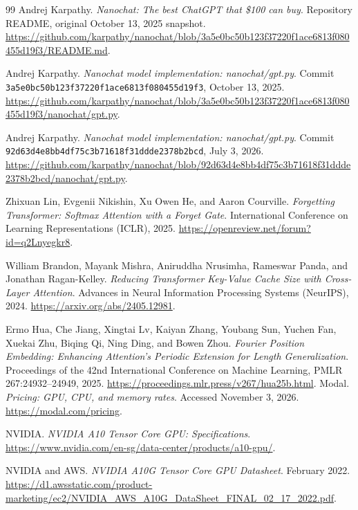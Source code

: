 \documentclass[11pt]{article}
\begin{document}
\clearpage
\begin{thebibliography}{99}
Andrej Karpathy. \emph{Nanochat: The best ChatGPT that \$100 can buy}.
Repository README, original October 13, 2025 snapshot.
\url{https://github.com/karpathy/nanochat/blob/3a5e0bc50b123f37220f1ace6813f080455d19f3/README.md}.

Andrej Karpathy. \emph{Nanochat model implementation: nanochat/gpt.py}.
Commit \texttt{3a5e0bc50b123f37220f1ace6813f080455d19f3}, October 13, 2025.
\url{https://github.com/karpathy/nanochat/blob/3a5e0bc50b123f37220f1ace6813f080455d19f3/nanochat/gpt.py}.

Andrej Karpathy. \emph{Nanochat model implementation: nanochat/gpt.py}.
Commit \texttt{92d63d4e8bb4df75c3b71618f31ddde2378b2bcd}, July 3, 2026.
\url{https://github.com/karpathy/nanochat/blob/92d63d4e8bb4df75c3b71618f31ddde2378b2bcd/nanochat/gpt.py}.

Zhixuan Lin, Evgenii Nikishin, Xu Owen He, and Aaron Courville.
\emph{Forgetting Transformer: Softmax Attention with a Forget Gate}.
International Conference on Learning Representations (ICLR), 2025.
\url{https://openreview.net/forum?id=q2Lnyegkr8}.

William Brandon, Mayank Mishra, Aniruddha Nrusimha, Rameswar Panda,
and Jonathan Ragan-Kelley.
\emph{Reducing Transformer Key-Value Cache Size with Cross-Layer Attention}.
Advances in Neural Information Processing Systems (NeurIPS), 2024.
\url{https://arxiv.org/abs/2405.12981}.

Ermo Hua, Che Jiang, Xingtai Lv, Kaiyan Zhang, Youbang Sun, Yuchen Fan,
Xuekai Zhu, Biqing Qi, Ning Ding, and Bowen Zhou.
\emph{Fourier Position Embedding: Enhancing Attention's Periodic Extension
for Length Generalization}.
Proceedings of the 42nd International Conference on Machine Learning,
PMLR 267:24932--24949, 2025.
\url{https://proceedings.mlr.press/v267/hua25b.html}.
Modal. \emph{Pricing: GPU, CPU, and memory rates}. Accessed November 3, 2026.
\url{https://modal.com/pricing}.

NVIDIA. \emph{NVIDIA A10 Tensor Core GPU: Specifications}.
\url{https://www.nvidia.com/en-sg/data-center/products/a10-gpu/}.

NVIDIA and AWS. \emph{NVIDIA A10G Tensor Core GPU Datasheet}. February 2022.
\url{https://d1.awsstatic.com/product-marketing/ec2/NVIDIA_AWS_A10G_DataSheet_FINAL_02_17_2022.pdf}.


\end{thebibliography}
\end{document}
